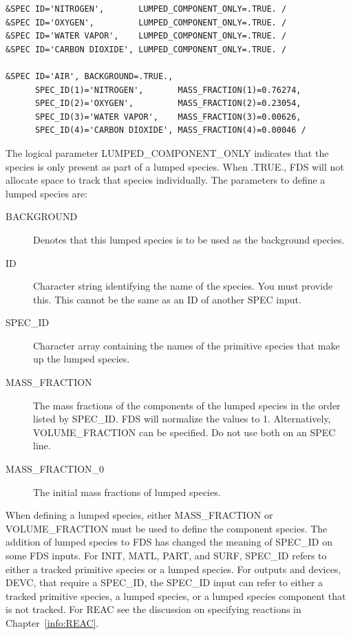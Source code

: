 \documentclass[11pt]{book}
\begin{document}
\begin{lstlisting}
&SPEC ID='NITROGEN',       LUMPED_COMPONENT_ONLY=.TRUE. /
&SPEC ID='OXYGEN',         LUMPED_COMPONENT_ONLY=.TRUE. /
&SPEC ID='WATER VAPOR',    LUMPED_COMPONENT_ONLY=.TRUE. /
&SPEC ID='CARBON DIOXIDE', LUMPED_COMPONENT_ONLY=.TRUE. /

&SPEC ID='AIR', BACKGROUND=.TRUE.,
      SPEC_ID(1)='NITROGEN',       MASS_FRACTION(1)=0.76274,
      SPEC_ID(2)='OXYGEN',         MASS_FRACTION(2)=0.23054,
      SPEC_ID(3)='WATER VAPOR',    MASS_FRACTION(3)=0.00626,
      SPEC_ID(4)='CARBON DIOXIDE', MASS_FRACTION(4)=0.00046 /
\end{lstlisting}
The logical parameter {\ct LUMPED\_COMPONENT\_ONLY} indicates that the species is only present as part of a lumped species. When {\ct .TRUE.}, FDS will not allocate space to track that species individually. The parameters to define a lumped species are:
\begin{description}
\item[{\ct BACKGROUND}] Denotes that this lumped species is to be used as the background species.
\item[{\ct ID}] Character string identifying the name of the species. You must provide this.  This cannot be the same as an {\ct ID} of another {\ct SPEC} input.
\item[{\ct SPEC\_ID}] Character array containing the names of the primitive species that make up the lumped species.
\item[{\ct MASS\_FRACTION}] The mass fractions of the components of the lumped species in the order listed by {\ct SPEC\_ID}.  FDS will normalize the values to 1. Alternatively, {\ct VOLUME\_FRACTION} can be specified. Do not use both on an {\ct SPEC} line.
\item[{\ct MASS\_FRACTION\_0}] The initial mass fractions of lumped species.
\end{description}
When defining a lumped species, either {\ct MASS\_FRACTION} or {\ct VOLUME\_FRACTION} must be used to define the component species. The addition of lumped species to FDS has changed the meaning of {\ct SPEC\_ID} on some FDS inputs.  For {\ct INIT},
{\ct MATL}, {\ct PART}, and {\ct SURF}, {\ct SPEC\_ID} refers to either a tracked primitive species or a lumped species.  For outputs and devices, {\ct DEVC}, that require a {\ct SPEC\_ID}, the {\ct SPEC\_ID} input can refer to either a tracked primitive species, a lumped species, or a lumped species component that is not tracked.  For {\ct REAC} see the discussion on specifying reactions in Chapter~\ref{info:REAC}.
\end{document}
